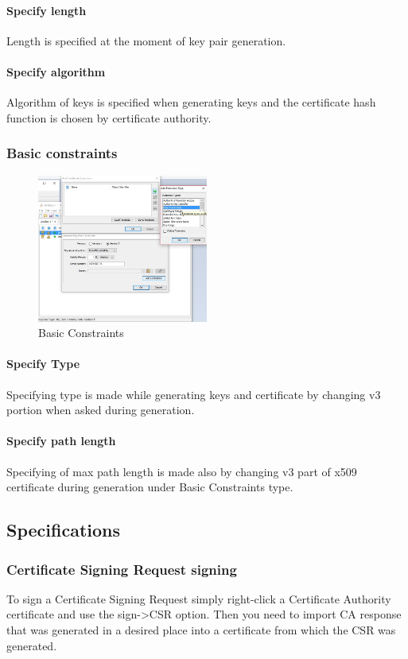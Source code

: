 \documentclass[10pt, a4paper]{report}
\begin{document}
      \paragraph{Specify length}
Length is specified at the moment of key pair generation.
      \paragraph{Specify algorithm}
Algorithm of keys is specified when generating keys and the certificate hash function is chosen by certificate authority.
    \subsubsection{Basic constraints}
\begin{figure}[!ht]
 \caption{Basic Constraints}
 \centering
  \includegraphics[width=0.5\textwidth]{../Dependancies/Keystore_Explorer/Basic_Constraints.jpg}
\end{figure}

      \paragraph{Specify Type}
Specifying type is made while generating keys and certificate by changing v3 portion when asked during generation.
      \paragraph{Specify path length}
Specifying of max path length is made also by changing v3 part of x509 certificate during generation under Basic Constraints type.
  \subsection{Specifications}
  
    \subsubsection{Certificate Signing Request signing}
To sign a Certificate Signing Request simply right-click a Certificate Authority certificate and use the sign->CSR option. Then you need to import CA response that was generated in a desired place into a certificate from which the CSR was generated.
\end{document}
